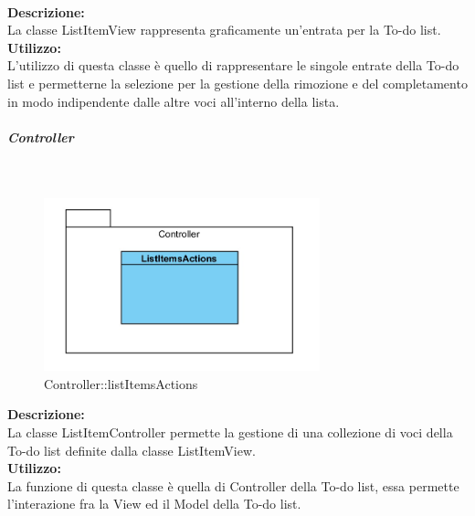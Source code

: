 \label{todo-item}\mbox{}\\
\textbf{Descrizione:}\\
La classe ListItemView rappresenta graficamente un'entrata per la To-do list.\\
\textbf{Utilizzo:}\\
L'utilizzo di questa classe è quello di rappresentare le singole entrate della To-do list e permetterne la selezione per la gestione della rimozione e del completamento in modo indipendente dalle altre voci all'interno della lista.\\




\subparagraph{Controller}\mbox{}
\begin{samepage}
	\label{todo-controller}\mbox{}\\
	\nopagebreak
	\begin{figure}[H]
		\centering
		\includegraphics[height=5cm]{diagrammi_img/classi_e_package/todo_controller}
		\caption{Controller\-::listItemsActions}
	\end{figure}
\end{samepage}
\textbf{Descrizione:}\\
La classe ListItemController permette la gestione di una collezione di voci della To-do list definite dalla classe ListItemView.\\
\textbf{Utilizzo:}\\
La funzione di questa classe è quella di Controller della To-do list, essa permette l'interazione fra la View ed il Model della To-do list.\\
